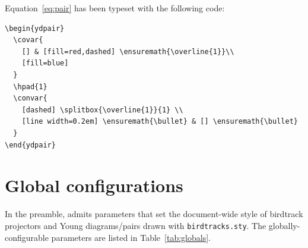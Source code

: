 \documentclass{article}
\begin{document}
Equation~\ref{eq:pair} has been typeset with the following code:
\begin{verbatim}
\begin{ydpair}
  \covar{
    [] & [fill=red,dashed] \ensuremath{\overline{1}}\\
    [fill=blue]
  }
  \hpad{1}
  \convar{
    [dashed] \splitbox{\overline{1}}{1} \\
    [line width=0.2em] \ensuremath{\bullet} & [] \ensuremath{\bullet}
  }
\end{ydpair}
\end{verbatim}

\pagebreak

\section{Global configurations}

In the preamble, \texttt{\string\birdtracksetup} admits parameters that set the document-wide style of birdtrack projectors and Young diagrams/pairs drawn with \texttt{birdtracks.sty}. The globally-configurable parameters are listed in Table~\ref{tab:globals}.
\end{document}

